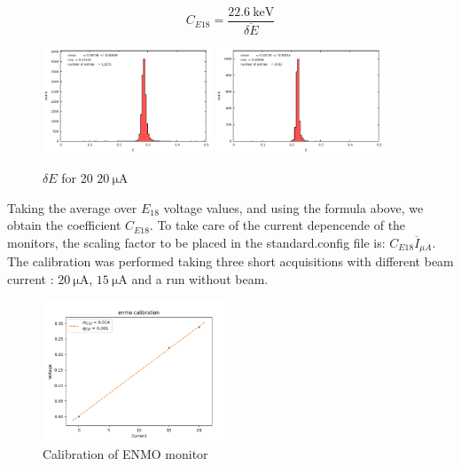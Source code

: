 {\begin{equation*}
C_{E18} = \frac{\SI{22.6}{\kilo \electronvolt}}{\overline{\delta E}}
\end{equation*}

\begin{figure}[hbtp]
\centering
\includegraphics[width = 0.45\textwidth]{Analysis/ENMOvoltage20.pdf}
\includegraphics[width = 0.45\textwidth]{Analysis/ENMOvoltage15.pdf} 
\caption{$\delta E$ for 20 $\SI{20}{\micro \ampere}$}
\end{figure}

Taking the average over $E_{18}$ voltage values, and using the formula above, we obtain the coefficient $C_{E18}$. To take care of the current depencende of the monitors, the scaling factor to be placed in the standard.config file is: $C_{E18} \overline{I}_{\mu A}$.
The calibration was performed taking three short acquisitions with different beam current : $\SI{20}{\micro \ampere}$, $\SI{15}{\micro \ampere}$ and a run without beam. 

\begin{figure}[hbtp]
\centering
\includegraphics[width = 0.5\textwidth]{Analysis/E18_Calibration.png}
\caption{Calibration of ENMO monitor}
\end{figure}

}
